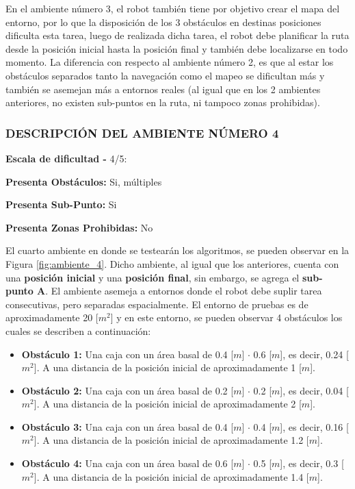 En el ambiente número 3, el robot también tiene por objetivo crear el mapa del entorno, por lo que la disposición de los 3 obstáculos en destinas posiciones dificulta esta tarea, luego de realizada dicha tarea, el robot debe planificar la ruta desde la posición inicial hasta la posición final y también debe localizarse en todo momento. La diferencia con respecto al ambiente número 2, es que al estar los obstáculos separados tanto la navegación como el mapeo se dificultan más y también se asemejan más a entornos reales (al igual que en los 2 ambientes anteriores, no existen sub-puntos en la ruta, ni tampoco zonas prohibidas).

\subsubsection{DESCRIPCIÓN DEL AMBIENTE NÚMERO 4}
\textbf{Escala de dificultad -} 4/5:

\hspace{5mm} \textbf{Presenta Obstáculos:} Si, múltiples

\hspace{5mm} \textbf{Presenta Sub-Punto:} Si

\hspace{5mm} \textbf{Presenta Zonas Prohibidas:} No

El cuarto ambiente en donde se testearán los algoritmos, se pueden observar en la Figura \ref{fig:ambiente_4}. Dicho ambiente, al igual que los anteriores, cuenta con una \textbf{posición inicial} y una \textbf{posición final}, sin embargo, se agrega el \textbf{sub-punto A}. El ambiente asemeja a entornos donde el robot debe suplir tarea consecutivas, pero separadas espacialmente.
El entorno de pruebas es de aproximadamente 20 [$m^{2}$] y en este entorno, se pueden observar 4 obstáculos los cuales se describen a continuación:
\begin{itemize}
    \item \textbf{Obstáculo 1:} Una caja con un área basal de 0.4 [$m$] $\cdot$ 0.6 [$m$], es decir, 0.24 [$m^{2}$]. A una distancia de la posición inicial de aproximadamente 1 [$m$].
    \item \textbf{Obstáculo 2:} Una caja con un área basal de 0.2 [$m$] $\cdot$ 0.2 [$m$], es decir, 0.04 [$m^{2}$]. A una distancia de la posición inicial de aproximadamente 2 [$m$].
    \item \textbf{Obstáculo 3:} Una caja con un área basal de 0.4 [$m$] $\cdot$ 0.4 [$m$], es decir, 0.16 [$m^{2}$]. A una distancia de la posición inicial de aproximadamente 1.2 [$m$].
    \item \textbf{Obstáculo 4:} Una caja con un área basal de 0.6 [$m$] $\cdot$ 0.5 [$m$], es decir, 0.3 [$m^{2}$]. A una distancia de la posición inicial de aproximadamente 1.4 [$m$].
\end{itemize} 

